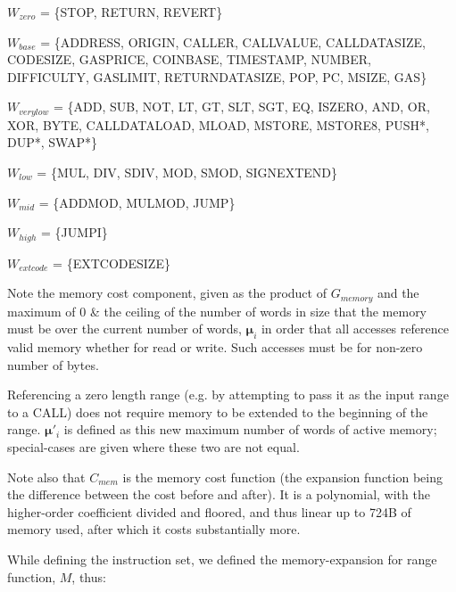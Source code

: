 \documentclass[9pt,oneside]{amsart}
\begin{document}
$W_{zero}$ = \{{\small STOP}, {\small RETURN}, {\small REVERT}\}

$W_{base}$ = \{{\small ADDRESS}, {\small ORIGIN}, {\small CALLER}, {\small CALLVALUE}, {\small CALLDATASIZE}, {\small CODESIZE}, {\small GASPRICE}, {\small COINBASE},\newline \noindent\hspace*{1cm} {\small TIMESTAMP}, {\small NUMBER}, {\small DIFFICULTY}, {\small GASLIMIT}, {\small RETURNDATASIZE}, {\small POP}, {\small PC}, {\small MSIZE}, {\small GAS}\}

$W_{verylow}$ = \{{\small ADD}, {\small SUB}, {\small NOT}, {\small LT}, {\small GT}, {\small SLT}, {\small SGT}, {\small EQ}, {\small ISZERO}, {\small AND}, {\small OR}, {\small XOR}, {\small BYTE}, {\small CALLDATALOAD}, \newline \noindent\hspace*{1cm} {\small MLOAD}, {\small MSTORE}, {\small MSTORE8}, {\small PUSH*}, {\small DUP*}, {\small SWAP*}\}

$W_{low}$ = \{{\small MUL}, {\small DIV}, {\small SDIV}, {\small MOD}, {\small SMOD}, {\small SIGNEXTEND}\}

$W_{mid}$ = \{{\small ADDMOD}, {\small MULMOD}, {\small JUMP}\}

$W_{high}$ = \{{\small JUMPI}\}

$W_{extcode}$ = \{{\small EXTCODESIZE}\}

Note the memory cost component, given as the product of $G_{memory}$ and the maximum of 0 \& the ceiling of the number of words in size that the memory must be over the current number of words, $\boldsymbol{\mu}_i$ in order that all accesses reference valid memory whether for read or write. Such accesses must be for non-zero number of bytes.

Referencing a zero length range (e.g. by attempting to pass it as the input range to a CALL) does not require memory to be extended to the beginning of the range. $\boldsymbol{\mu}'_i$ is defined as this new maximum number of words of active memory; special-cases are given where these two are not equal.

Note also that $C_{mem}$ is the memory cost function (the expansion function being the difference between the cost before and after). It is a polynomial, with the higher-order coefficient divided and floored, and thus linear up to 724B of memory used, after which it costs substantially more.

While defining the instruction set, we defined the memory-expansion for range function, $M$, thus:
\end{document}
